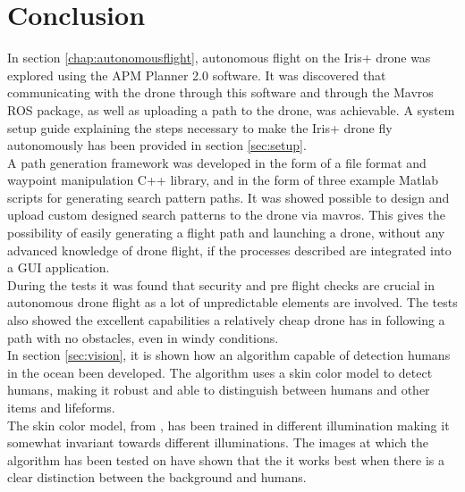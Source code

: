 \chapter{Conclusion}

In section \ref{chap:autonomousflight}, autonomous flight on the Iris+ drone was explored using the APM Planner 2.0 software.
It was discovered that communicating with the drone through this software and through the Mavros ROS package,
as well as uploading a path to the drone, was achievable.
A system setup guide explaining the steps necessary to make the Iris+ drone fly autonomously has been provided in section \ref{sec:setup}.
\\
A path generation framework was developed in the form of a file format and waypoint manipulation C++ library,
and in the form of three example Matlab scripts for generating search pattern paths.
It was showed possible to design and upload custom designed search patterns to the drone via mavros.
This gives the possibility of easily generating a flight path and launching a drone, without any advanced knowledge of drone flight,
if the processes described are integrated into a GUI application.\\

During the tests it was found that security and pre flight checks are crucial in autonomous drone flight
as a lot of unpredictable elements are involved.
The tests also showed the excellent capabilities a relatively cheap drone has in following a path with no obstacles, even in windy conditions.\\

In section \ref{sec:vision}, it is shown how an algorithm capable of detection humans in the ocean been developed. 
The algorithm uses a skin color model to detect humans, making it robust and able to distinguish between humans and other items and lifeforms.\\
 
The skin color model, from \cite{Ref:SkinDetection}, has been trained in different illumination
making it somewhat invariant towards different illuminations.
The images at which the algorithm has been tested on have shown
that the it works best when there is a
clear distinction between the background and humans.
\newpage